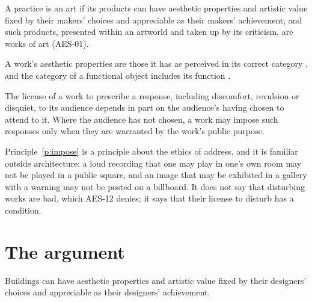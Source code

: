 \documentclass{situationist-preprint}
\begin{document}
\begin{principle}[Art]\label{p:art}
A practice is an art if its products can have aesthetic properties and artistic value fixed by their makers' choices and appreciable as their makers' achievement; and such products, presented within an artworld and taken up by its criticism, are works of art (AES-01).
\end{principle}

\begin{principle}[Category]\label{p:cat}
A work's aesthetic properties are those it has as perceived in its correct category \citep{Walton1970}, and the category of a functional object includes its function \citep{ParsonsCarlson2008}.
\end{principle}

\begin{principle}[Imposition]\label{p:impose}
The license of a work to prescribe a response, including discomfort, revulsion or disquiet, to its audience depends in part on the audience's having chosen to attend to it. Where the audience has not chosen, a work may impose such responses only when they are warranted by the work's public purpose.
\end{principle}

Principle~\ref{p:impose} is a principle about the ethics of address, and it is familiar outside architecture: a loud recording that one may play in one's own room may not be played in a public square, and an image that may be exhibited in a gallery with a warning may not be posted on a billboard. It does not say that disturbing works are bad, which AES-12 denies; it says that their license to disturb has a condition.

\section{The argument}

\begin{lemma}\label{l:func}
Buildings can have aesthetic properties and artistic value fixed by their designers' choices and appreciable as their designers' achievement.
\end{lemma}
\end{document}
